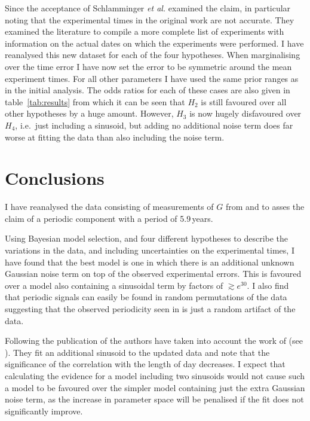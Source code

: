 \documentclass[comment]{epl2}
\begin{document}
Since the acceptance of \cite{2015EL....11010002A} Schlamminger {\it et al.} \cite{2015arXiv150501774S}
examined the claim, in particular noting that the experimental times in the original work
are not accurate. They examined the literature to compile a more complete list of
experiments with information on the actual dates on which the experiments were performed.
I have reanalysed this new dataset for each of the four hypotheses. When marginalising over the
time error I have now set the error to be symmetric around the mean experiment times.
For all other parameters I have used the same prior ranges as in the initial analysis.
The odds ratios for each of these cases are also given in table~\ref{tab:results} from which it can
be seen that $H_2$ is still favoured over all other hypotheses by a huge amount. However, $H_3$
is now hugely disfavoured over $H_4$, i.e.\ just including a sinusoid, but adding no additional noise
term does far worse at fitting the data than also including the noise term.

\section{Conclusions}

I have reanalysed the data consisting of measurements of $G$ from
\cite{2015EL....11010002A} and \cite{2015arXiv150501774S} to asses the claim of a periodic
component with a period of 5.9\,years.

Using Bayesian model selection, and four different hypotheses to describe the variations in the data, and including
uncertainties on the experimental times, I have found that the best model is one in which
there is an additional unknown Gaussian noise term on top of the observed experimental errors. This is 
favoured over a model also containing a sinusoidal term by factors of $\gtrsim e^{30}$. I also find that periodic
signals can easily be found in random permutations of the data suggesting that the observed periodicity seen in
\cite{2015EL....11010002A} is just a random artifact of the data.

Following the publication of \cite{2015EL....11010002A} the authors have taken into account the work of \cite{2015arXiv150501774S} (see \cite{AndersonRevised}). They fit an additional
sinusoid to the updated data and note that the significance of the correlation with the length of day decreases. 
I expect that calculating the evidence for a model including two sinusoids would not cause such a model to be
favoured over the simpler model containing just the
extra Gaussian noise term, as the increase in parameter space will be penalised if the fit does not 
significantly improve.
\end{document}
